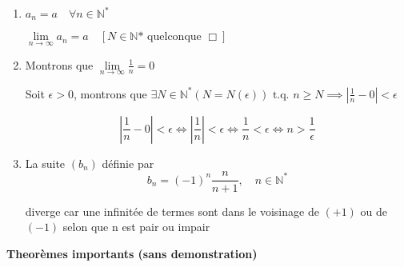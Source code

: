 \documentclass[
    11pt,
    a4paper,
    oneside,
    headinlcude, footinclude,
    twoside,
]{report}
\newcommand{\tq}[0]{\textrm{ t.q. }}
\begin{document}
\begin{enumerate}
\item $a_{n} = a \quad \forall n \in \mathbb{N} ^{\ast}$

$\lim\limits_{n \rightarrow \infty} a_{n} = a \quad [N \in \mathbb{N}
\textrm{* quelconque }\Box]$

\item Montrons que $\lim\limits_{n \rightarrow \infty} \frac{1}{n} = 0$

Soit $\epsilon > 0$, montrons que $\exists N \in \mathbb{N} ^{\ast} (N
= N(\epsilon)) \tq n \geq N \implies | \frac{1}{n} - 0 | < \epsilon$

$$| \frac{1}{n} - 0 | < \epsilon \iff | \frac{1}{n} | < \epsilon \iff
\frac{1}{n} < \epsilon \iff n > \frac{1}{\epsilon}$$

\item  La suite $(b_{n})$ définie par 
$$b_{n} = (-1)^{n} \frac{n}{n+1}, \quad n \in \mathbb{N} ^{\ast} $$

diverge car une infinitée de termes sont dans le voisinage de $(+1)$
ou de $(-1)$ selon que n est pair ou impair

\end{enumerate}

\textbf{Theorèmes importants (sans demonstration)}
\end{document}
